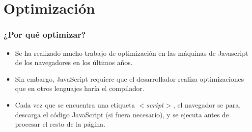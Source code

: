 
\section{Optimización}

%
%
%



%
%
%


\begin{frame}
\frametitle{¿Por qué optimizar?}

\begin{itemize}
  \item Se ha realizado mucho trabajo de optimización en las máquinas de Javascript de los navegadores en los últimos años.
  \item Sin embargo, JavaScript requiere que el desarrollador realiza optimizaciones que en otros lenguajes haría el compilador.
  \item Cada vez que se encuentra una etiqueta $<script>$, el navegador se para, descarga
el código JavaScript (si fuera necesario), y se ejecuta antes de procesar el resto
de la página. 
\end{itemize}

\end{frame}



